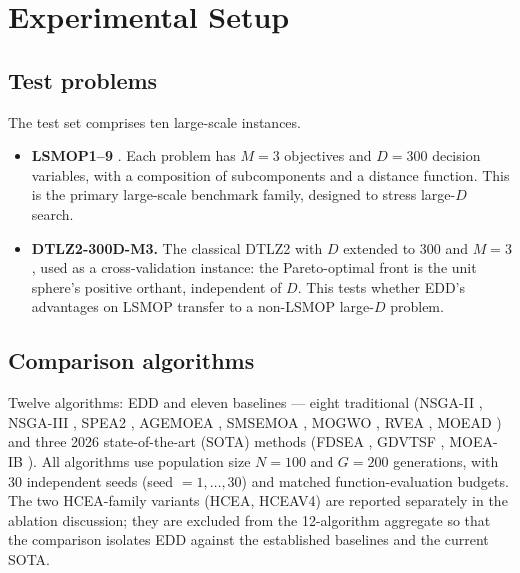 \documentclass[preprint,12pt]{elsarticle}
\begin{document}
\section{Experimental Setup}
\label{sec:setup}

\subsection{Test problems}

The test set comprises ten large-scale instances.

\begin{itemize}
\item \textbf{LSMOP1--9} \cite{cheng2017test}. Each problem has $M = 3$
objectives and $D = 300$ decision variables, with a composition of
subcomponents and a distance function. This is the primary large-scale
benchmark family, designed to stress large-$D$ search.

\item \textbf{DTLZ2-300D-M3.} The classical DTLZ2 \cite{debscalable} with
$D$ extended to 300 and $M = 3$, used as a cross-validation instance: the
Pareto-optimal front is the unit sphere's positive orthant, independent of
$D$. This tests whether EDD's advantages on LSMOP transfer to a non-LSMOP
large-$D$ problem.
\end{itemize}

\subsection{Comparison algorithms}

Twelve algorithms: EDD and eleven baselines --- eight traditional
(NSGA-II \cite{deb2002a}, NSGA-III \cite{deb2014an}, SPEA2
\cite{zitzler2001spea2}, AGEMOEA \cite{panichella2019an}, SMSEMOA
\cite{beume2007smsemoa}, MOGWO \cite{mirjalili2016multiobjective}, RVEA
\cite{cheng2016a}, MOEAD \cite{qingfuzhang2007moead}) and three 2026
state-of-the-art (SOTA) methods (FDSEA \cite{fdsea2026}, GDVTSF
\cite{gdvtsf2026}, MOEA-IB \cite{moaib2026}). All algorithms use
population size $N = 100$ and $G = 200$ generations, with 30 independent
seeds (seed $= 1,\dots,30$) and matched function-evaluation budgets. The
two HCEA-family variants (HCEA, HCEAV4) are reported separately in the
ablation discussion; they are excluded from the 12-algorithm aggregate so
that the comparison isolates EDD against the established baselines and the
current SOTA.
\end{document}
